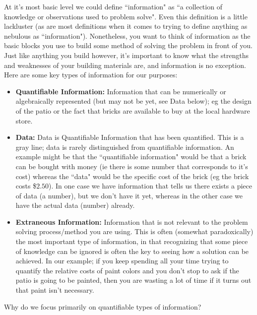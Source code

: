 \documentclass{ximera}
\begin{document}
At it's most basic level we could define ``information" as ``a collection of knowledge or observations used to problem solve". Even this definition is a little lackluster (as are most definitions when it comes to trying to define anything as nebulous as ``information"). Nonetheless, you want to think of information as the basic blocks you use to build some method of solving the problem in front of you. Just like anything you build however, it's important to know what the strengths and weaknesses of your building materials are, and information is no exception. Here are some key types of information for our purposes:
\begin{itemize}
    \item{\textbf{Quantifiable Information:}} Information that can be numerically or algebraically represented (but may not be yet, see Data below); eg the design of the patio or the fact that bricks are available to buy at the local hardware store.
    \item{\textbf{Data:}} Data is Quantifiable Information that has been quantified. This is a gray line; data is rarely distinguished from quantifiable information. An example might be that the ``quantifiable information" would be that a brick can be bought with money (ie there is some number that corresponds to it's cost) whereas the ``data" would be the specific cost of the brick (eg the brick costs \$$2.50$). In one case we have information that tells us there exists a piece of data (a number), but we don't have it yet, whereas in the other case we have the actual data (number) already.
    \item{\textbf{Extraneous Information:}} Information that is not relevant to the problem solving process/method you are using. This is often (somewhat paradoxically) the most important type of information, in that recognizing that some piece of knowledge can be ignored is often the key to seeing how a solution can be achieved. In our example; if you keep spending all your time trying to quantify the relative costs of paint colors and you don't stop to ask if the patio is going to be painted, then you are wasting a lot of time if it turns out that paint isn't necessary.
\end{itemize}



\begin{problem}
    Why do we focus primarily on quantifiable types of information?
    \begin{multipleChoice}
    \end{multipleChoice}
\end{problem}
\end{document}
